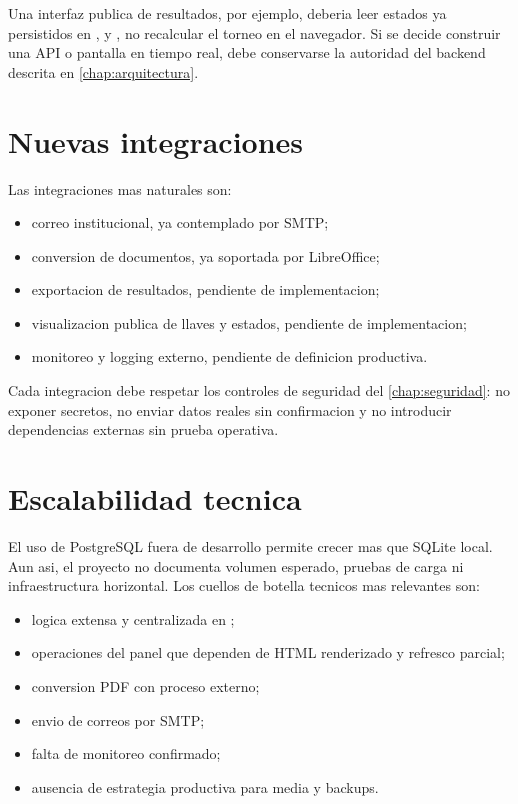 Una interfaz publica de resultados, por ejemplo, deberia leer estados ya persistidos en ,  y , no recalcular el torneo en el navegador. Si se decide construir una API o pantalla en tiempo real, debe conservarse la autoridad del backend descrita en \cref{chap:arquitectura}.

\section{Nuevas integraciones}
\label{sec:escalabilidad-integraciones}

Las integraciones mas naturales son:

\begin{itemize}
  \item correo institucional, ya contemplado por SMTP;
  \item conversion de documentos, ya soportada por LibreOffice;
  \item exportacion de resultados, pendiente de implementacion;
  \item visualizacion publica de llaves y estados, pendiente de implementacion;
  \item monitoreo y logging externo, pendiente de definicion productiva.
\end{itemize}

Cada integracion debe respetar los controles de seguridad del \cref{chap:seguridad}: no exponer secretos, no enviar datos reales sin confirmacion y no introducir dependencias externas sin prueba operativa.

\section{Escalabilidad tecnica}
\label{sec:escalabilidad-tecnica}

El uso de PostgreSQL fuera de desarrollo permite crecer mas que SQLite local. Aun asi, el proyecto no documenta volumen esperado, pruebas de carga ni infraestructura horizontal. Los cuellos de botella tecnicos mas relevantes son:

\begin{itemize}
  \item logica extensa y centralizada en ;
  \item operaciones del panel que dependen de HTML renderizado y refresco parcial;
  \item conversion PDF con proceso externo;
  \item envio de correos por SMTP;
  \item falta de monitoreo confirmado;
  \item ausencia de estrategia productiva para media y backups.
\end{itemize}

